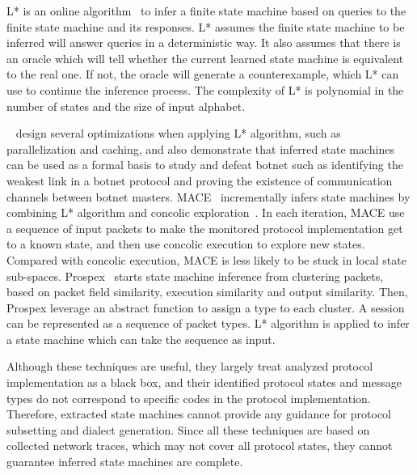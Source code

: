 L* is an online algorithm~\citep{L1,L2} to infer a finite state machine 
based on queries to the finite state machine and its responses. 
L* assumes the finite state machine to be inferred will answer queries in a deterministic way. 
It also assumes that there is an oracle which will tell whether the current learned state machine is equivalent to the real one.
If not, the oracle will generate a counterexample, which L* can use to continue the inference process. 
The complexity of L* is polynomial in the number of states and the size of input alphabet. 


~\citet{botnet-inference} design several optimizations when applying L* algorithm, 
such as parallelization and caching, and also demonstrate that 
inferred state machines can be used as a formal basis to study and defeat botnet
such as identifying the weakest link in a botnet protocol and proving the existence 
of communication channels between botnet masters.  
MACE~\citep{MACE} incrementally infers state machines by combining 
L* algorithm and concolic exploration~\citep{dart,cute}. 
In each iteration, MACE use a sequence of input packets to make the monitored protocol 
implementation get to a known state, and then use concolic execution to explore new states.  
Compared with concolic execution, MACE is less likely to be stuck in local state sub-spaces. 
Prospex~\citep{Prospex} starts state machine inference from clustering packets, 
based on packet field similarity, execution similarity and output similarity. 
Then, Prospex leverage an abstract function to assign a type to each cluster. 
A session can be represented as a sequence of packet types. 
L* algorithm is applied to infer a state machine which can take the sequence as input. 

Although these techniques are useful, 
they largely treat analyzed protocol implementation as a black box, 
and their identified protocol states and message types 
do not correspond to specific codes in the protocol implementation.
Therefore, extracted state machines cannot provide any guidance for protocol subsetting and dialect generation. 
Since all these techniques are based on collected network traces, 
which may not cover all protocol states, 
they cannot guarantee inferred state machines are complete. 
